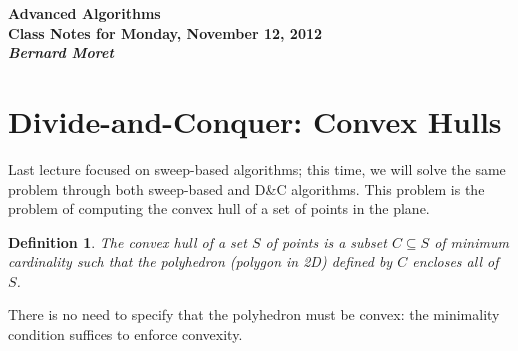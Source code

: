 \documentclass[11pt]{article}
\newtheorem{definition}{Definition}
\begin{document}
\begin{center}
  \LARGE\bf Advanced Algorithms\\

  \Large\sf
  Class Notes for Monday, November 12, 2012\\

  \it
  Bernard Moret
\end{center}

\bigskip


\section{Divide-and-Conquer: Convex Hulls}
Last lecture focused on sweep-based algorithms; this time, we will solve
the same problem through both sweep-based and D\&{}C algorithms.
This problem is the problem of computing the convex hull of a set of points
in the plane.
\begin{definition}
  The convex hull of a set $S$ of points is a subset $C\subseteq S$ of minimum
  cardinality such that the polyhedron (polygon in 2D) defined by $C$
  encloses all of $S$.
\end{definition}
There is no need to specify that the polyhedron must be convex: the minimality
condition suffices to enforce convexity.
\end{document}
